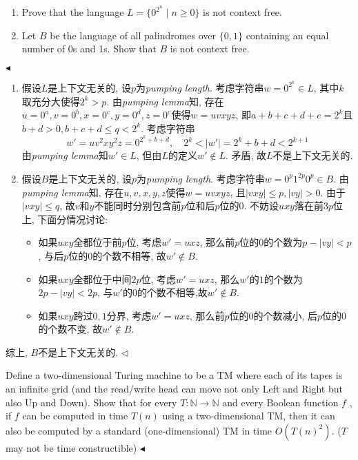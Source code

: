 \documentclass[11pt]{article}
\newenvironment{problem}[2][Problem]{\begin{trivlist}
\item[\hskip \labelsep{\bfseries#1}\hskip\labelsep{\bfseries#2.}]}{\hfill$\blacktriangleleft$\end{trivlist}}
\newenvironment{answer}[1][Answer]{\begin{trivlist}
\item[\hskip \labelsep{\bfseries\itshape#1.}\hskip \labelsep]}{\hfill$\lhd$\end{trivlist}}
\begin{document}
\begin{problem}{3.(12 points)}
    $~$
    \begin{enumerate}[label = (\alph*)]
        \item Prove that the language $L = \{0^{2^n} \mid n \ge 0\}$ is not context free.
        \item Let $B$ be the language of all palindromes over $\{0, 1\}$ containing an equal number of 0s and 1s.
        Show that $B$ is not context free.
    \end{enumerate}
\end{problem}
\begin{answer}
    \begin{enumerate}[label = (\alph*)]
        \item 假设$L$是上下文无关的, 设$p$为\emph{pumping length}. 考虑字符串$w = 0^{2^k} \in L$, 其中$k$取充分大使得$2^k > p$. 由\emph{pumping lemma}知, 存在$u = 0^a,v = 0^b,x = 0^c,y = 0^d,z=0^e$使得$w = uvxyz$, 即$a+b+c+d+e = 2^k$且$b+d > 0, b+c+d \le q < 2^k$. 考虑字符串
        \[ w'=uv^2xy^2z = 0^{2^k + b+d}, \quad 2^k < |w'| = 2^k + b + d < 2^{k+1} \]
        由\emph{pumping lemma}知$w' \in L$, 但由$L$的定义$w' \not\in L$. 矛盾, 故$L$不是上下文无关的.
        \item 假设$B$是上下文无关的, 设$p$为\emph{pumping length}. 考虑字符串$w = 0^{p}1^{2p}0^{p} \in B$. 由\emph{pumping lemma}知, 存在$u,v,x,y,z$使得$w = uvxyz$, 且$|vxy| \le p, |vy| > 0$. 由于$|vxy|\le q$, 故$v$和$y$不能同时分别包含前$p$位和后$p$位的$0$. 不妨设$uxy$落在前$3p$位上, 下面分情况讨论:
        \begin{itemize}
            \item 如果$uxy$全都位于前$p$位, 考虑$w' = uxz$, 那么前$p$位的$0$的个数为$p-|vy| < p$, 与后$p$位的$0$的个数不相等, 故$w' \not\in B$.
            \item 如果$uxy$全都位于中间$2p$位, 考虑$w' = uxz$, 那么$w'$的$1$的个数为$2p - |vy| < 2p$, 与$w'$的$0$的个数不相等,故$w' \not\in B$.
            \item 如果$uxy$跨过$0,1$分界, 考虑$w' = uxz$, 那么前$p$位的$0$的个数减小, 后$p$位的$0$的个数不变, 故$w' \not\in B$.
        \end{itemize}
    \end{enumerate}
    综上, $B$不是上下文无关的.
\end{answer}

\begin{problem}{4.(16 points)}
    Define a two-dimensional Turing machine to be a TM where each of its tapes is an infinite grid (and the read/write head can move not only Left and Right but also Up and Down). Show that for every $T: \mathbb{N} \rightarrow \mathbb{N}$ and every Boolean function $f$ , if $f$ can be computed in time $T(n)$ using a two-dimensional TM, then it can also be computed by a standard (one-dimensional) TM in time $O(T(n)^2)$. ($T$ may not be time constructible)
\end{problem}
\end{document}
